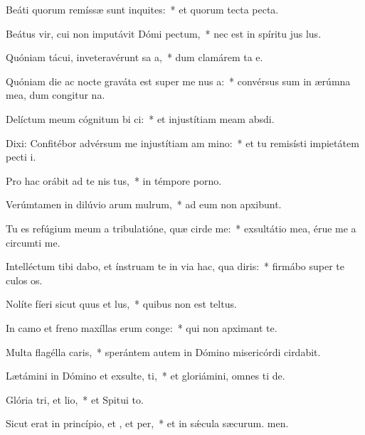 \item Beáti quorum remíssæ sunt inquites:~* et quorum tecta  pecta.
\item Beátus vir, cui non imputávit Dómi pectum,~* nec est in spíritu jus lus.
\item Quóniam tácui, inveteravérunt sa a,~* dum clamárem ta e.
\item Quóniam die ac nocte graváta est super me nus a:~* convérsus sum in ærúmna mea, dum congitur na.
\item Delíctum meum cógnitum bi ci:~* et injustítiam meam  absdi.
\item Dixi: Confitébor advérsum me injustítiam am mino:~* et tu remisísti impietátem pecti i.
\item Pro hac orábit ad te nis tus,~* in témpore porno.
\item Verúmtamen in dilúvio arum mulrum,~* ad eum non apxibunt.
\item Tu es refúgium meum a tribulatióne, quæ cirde me:~* exsultátio mea, érue me a circumti me.
\item Intelléctum tibi dabo, et ínstruam te in via hac, qua diris:~* firmábo super te culos os.
\item Nolíte fíeri sicut quus et lus,~* quibus non est teltus.
\item In camo et freno maxíllas erum conge:~* qui non apximant  te.
\item Multa flagélla caris,~* sperántem autem in Dómino misericórdi cirdabit.
\item Lætámini in Dómino et exsulte, ti,~* et gloriámini, omnes ti de.
\item Glória tri, et lio,~* et Spitui to.
\item Sicut erat in princípio, et , et per,~* et in sǽcula sæcurum. men.
